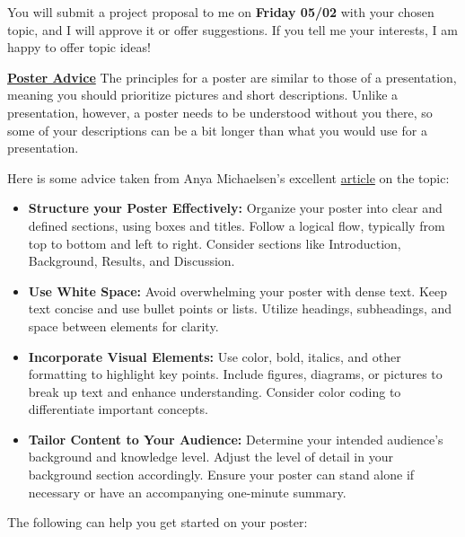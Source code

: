 \documentclass[12pt]{article}
\begin{document}
You will submit a project proposal to me on \textbf{Friday 05/02} with your chosen topic, and I will approve it or offer suggestions. If you tell me your interests, I am happy to offer topic ideas!

\textbf{\underline{Poster Advice}}
The principles for a poster are similar to those of a presentation, meaning you should prioritize pictures and short descriptions. Unlike a presentation, however, a poster needs to be understood without you there, so some of your descriptions can be a bit longer than what you would use for a presentation.

Here is some advice taken from Anya Michaelsen's excellent \href{https://www.ams.org/journals/notices/202002/rnoti-p189.pdf}{article} on the topic:
\begin{itemize}
    \item \textbf{Structure your Poster Effectively:} Organize your poster into clear and defined sections, using boxes and titles. Follow a logical flow, typically from top to bottom and left to right. Consider sections like Introduction, Background, Results, and Discussion.

    \item \textbf{Use White Space:} Avoid overwhelming your poster with dense text. Keep text concise and use bullet points or lists. Utilize headings, subheadings, and space between elements for clarity.

    \item \textbf{Incorporate Visual Elements:} Use color, bold, italics, and other formatting to highlight key points. Include figures, diagrams, or pictures to break up text and enhance understanding. Consider color coding to differentiate important concepts.

    \item \textbf{Tailor Content to Your Audience:} Determine your intended audience's background and knowledge level. Adjust the level of detail in your background section accordingly. Ensure your poster can stand alone if necessary or have an accompanying one-minute summary.
\end{itemize}
\newpage
The following can help you get started on your poster:
\end{document}
